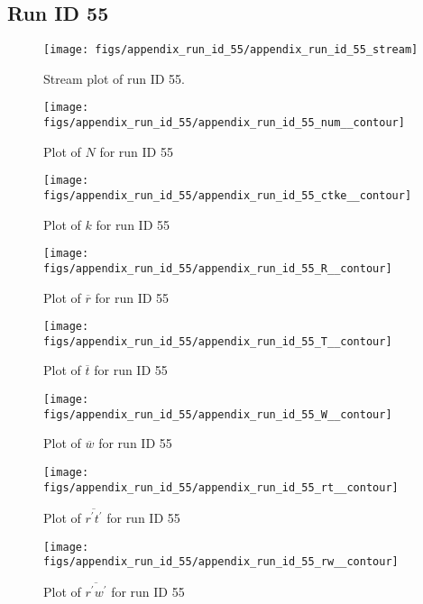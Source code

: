 \subsection{Run ID 55}
\begin{figure}[H]
\centering
\texttt{[image: figs/appendix\_run\_id\_55/appendix\_run\_id\_55\_stream]}
\caption{Stream plot of run ID 55.}
\label{fig:appendix_run_id_55_stream}
\end{figure}


\begin{figure}[H]
\centering
\texttt{[image: figs/appendix\_run\_id\_55/appendix\_run\_id\_55\_num\_\_contour]}
\caption{Plot of $N$ for run ID 55}
\label{fig:appendix_run_id_55_num__contour}
\end{figure}


\begin{figure}[H]
\centering
\texttt{[image: figs/appendix\_run\_id\_55/appendix\_run\_id\_55\_ctke\_\_contour]}
\caption{Plot of $k$ for run ID 55}
\label{fig:appendix_run_id_55_ctke__contour}
\end{figure}


\begin{figure}[H]
\centering
\texttt{[image: figs/appendix\_run\_id\_55/appendix\_run\_id\_55\_R\_\_contour]}
\caption{Plot of $\overline{r}$ for run ID 55}
\label{fig:appendix_run_id_55_R__contour}
\end{figure}


\begin{figure}[H]
\centering
\texttt{[image: figs/appendix\_run\_id\_55/appendix\_run\_id\_55\_T\_\_contour]}
\caption{Plot of $\overline{t}$ for run ID 55}
\label{fig:appendix_run_id_55_T__contour}
\end{figure}


\begin{figure}[H]
\centering
\texttt{[image: figs/appendix\_run\_id\_55/appendix\_run\_id\_55\_W\_\_contour]}
\caption{Plot of $\overline{w}$ for run ID 55}
\label{fig:appendix_run_id_55_W__contour}
\end{figure}


\begin{figure}[H]
\centering
\texttt{[image: figs/appendix\_run\_id\_55/appendix\_run\_id\_55\_rt\_\_contour]}
\caption{Plot of $\overline{r^\prime t^\prime}$ for run ID 55}
\label{fig:appendix_run_id_55_rt__contour}
\end{figure}


\begin{figure}[H]
\centering
\texttt{[image: figs/appendix\_run\_id\_55/appendix\_run\_id\_55\_rw\_\_contour]}
\caption{Plot of $\overline{r^\prime w^\prime}$ for run ID 55}
\label{fig:appendix_run_id_55_rw__contour}
\end{figure}


